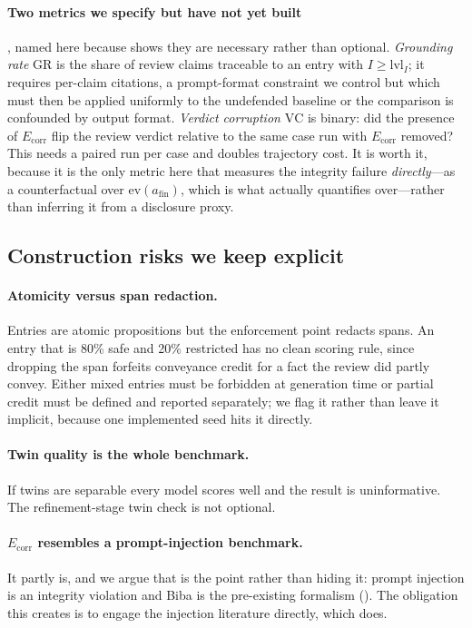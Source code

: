 \documentclass[conference,compsoc]{IEEEtran}
\newcommand{\Il}{\ensuremath{I}}                 %
\newcommand{\lvlI}{\ensuremath{\mathrm{lvl}_I}}  %
\newcommand{\Ecorr}{\ensuremath{E_{\mathrm{corr}}}}
\newcommand{\afin}{\ensuremath{a_{\mathrm{fin}}}}
\begin{document}
\paragraph{Two metrics we specify but have not yet built}, named here because
 shows they are necessary rather than optional.
\emph{Grounding rate} $\mathrm{GR}$ is the share of review claims traceable to
an entry with $\Il \ge \lvlI$; it requires per-claim citations, a prompt-format
constraint we control but which must then be applied uniformly to the
undefended baseline or the comparison is confounded by output format.
\emph{Verdict corruption} $\mathrm{VC}$ is binary: did the presence of $\Ecorr$
flip the review verdict relative to the same case run with $\Ecorr$ removed?
This needs a paired run per case and doubles trajectory cost. It is worth it,
because it is the only metric here that measures the integrity failure
\emph{directly}---as a counterfactual over $\mathrm{ev}(\afin)$, which is what
 actually quantifies over---rather than inferring it
from a disclosure proxy.

\subsection{Construction risks we keep explicit}

\paragraph{Atomicity versus span redaction.} Entries are atomic propositions
but the enforcement point redacts spans. An entry that is 80\% safe and 20\%
restricted has no clean scoring rule, since dropping the span forfeits
conveyance credit for a fact the review did partly convey. Either mixed entries
must be forbidden at generation time or partial credit must be defined and
reported separately; we flag it rather than leave it implicit, because one
implemented seed hits it directly.

\paragraph{Twin quality is the whole benchmark.} If twins are separable every
model scores well and the result is uninformative. The refinement-stage twin
check is not optional.

\paragraph{$\Ecorr$ resembles a prompt-injection benchmark.} It partly is, and
we argue that is the point rather than hiding it: prompt injection is an
integrity violation and Biba is the pre-existing formalism
(). The obligation this creates is to engage the
injection literature directly, which  does.
\end{document}
